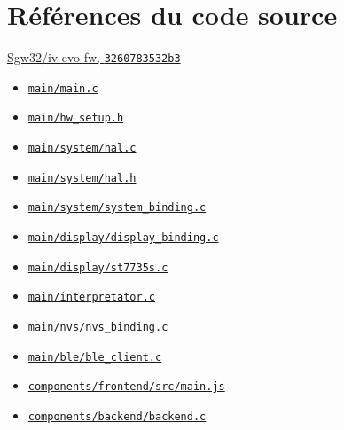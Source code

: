 \section{Références du code source}
\href{https://github.com/Sgw32/iv-evo-fw/tree/3260783532b3d4ad8529b23f4e907c0a6ab03262}{Sgw32/iv-evo-fw, \texttt{3260783532b3}}
\begin{itemize}
\item \href{https://github.com/Sgw32/iv-evo-fw/blob/3260783532b3d4ad8529b23f4e907c0a6ab03262/main/main.c}{\nolinkurl{main/main.c}}
\item \href{https://github.com/Sgw32/iv-evo-fw/blob/3260783532b3d4ad8529b23f4e907c0a6ab03262/main/hw_setup.h}{\nolinkurl{main/hw_setup.h}}
\item \href{https://github.com/Sgw32/iv-evo-fw/blob/3260783532b3d4ad8529b23f4e907c0a6ab03262/main/system/hal.c}{\nolinkurl{main/system/hal.c}}
\item \href{https://github.com/Sgw32/iv-evo-fw/blob/3260783532b3d4ad8529b23f4e907c0a6ab03262/main/system/hal.h}{\nolinkurl{main/system/hal.h}}
\item \href{https://github.com/Sgw32/iv-evo-fw/blob/3260783532b3d4ad8529b23f4e907c0a6ab03262/main/system/system_binding.c}{\nolinkurl{main/system/system_binding.c}}
\item \href{https://github.com/Sgw32/iv-evo-fw/blob/3260783532b3d4ad8529b23f4e907c0a6ab03262/main/display/display_binding.c}{\nolinkurl{main/display/display_binding.c}}
\item \href{https://github.com/Sgw32/iv-evo-fw/blob/3260783532b3d4ad8529b23f4e907c0a6ab03262/main/display/st7735s.c}{\nolinkurl{main/display/st7735s.c}}
\item \href{https://github.com/Sgw32/iv-evo-fw/blob/3260783532b3d4ad8529b23f4e907c0a6ab03262/main/interpretator.c}{\nolinkurl{main/interpretator.c}}
\item \href{https://github.com/Sgw32/iv-evo-fw/blob/3260783532b3d4ad8529b23f4e907c0a6ab03262/main/nvs/nvs_binding.c}{\nolinkurl{main/nvs/nvs_binding.c}}
\item \href{https://github.com/Sgw32/iv-evo-fw/blob/3260783532b3d4ad8529b23f4e907c0a6ab03262/main/ble/ble_client.c}{\nolinkurl{main/ble/ble_client.c}}
\item \href{https://github.com/Sgw32/iv-evo-fw/blob/3260783532b3d4ad8529b23f4e907c0a6ab03262/components/frontend/src/main.js}{\nolinkurl{components/frontend/src/main.js}}
\item \href{https://github.com/Sgw32/iv-evo-fw/blob/3260783532b3d4ad8529b23f4e907c0a6ab03262/components/backend/backend.c}{\nolinkurl{components/backend/backend.c}}

\end{itemize}
